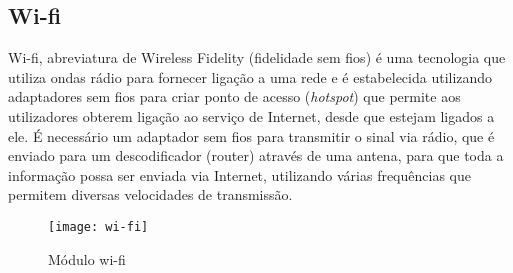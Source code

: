 \subsection{Wi-fi}
\label{subsec:wi-fi}
Wi-fi, abreviatura de Wireless Fidelity (fidelidade sem fios) é uma tecnologia que utiliza ondas rádio para fornecer ligação a uma rede e é estabelecida utilizando adaptadores sem fios para criar ponto de acesso (\emph{hotspot}) que permite aos utilizadores obterem ligação ao serviço de Internet, desde que estejam ligados a ele. É necessário um adaptador sem fios para transmitir o sinal via rádio, que é enviado para um descodificador (router) através de uma antena, para que toda a informação possa ser enviada via Internet, utilizando várias frequências que permitem diversas velocidades de transmissão.
\begin{figure}[htbp]
	\centering
	\texttt{[image: wi-fi]}
	\caption{Módulo wi-fi}
	\label{fig:modulo_wifi}
\end{figure}